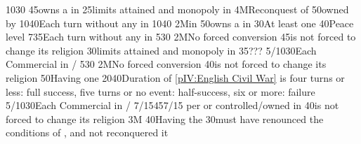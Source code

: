 
 
%
%
{10}{30}{}%
%
%
{}{45}{\ANG owns a \Presidio in \provincePicardie}%
%
%
{}{25}{\MNU limits attained and monopoly in }%
%
\EUobjective4M{Reconquest of \provinceGuyenne}{}%
{}{50}{\provinceGuyenne owned by \paysmajeurAngleterre}%
%
%
{10}{40}{Each turn without any \REVOLT in \regionIrlande}%
%
%
%
{10}{40}{}%
%
\EUobjective2M{\Presidio in \provincePicardie}{}%
{}{50}{\ANG owns a \Presidio in \provincePicardie}%
%
%
{}{30}{At least one \COL}%
%
%
{}{40}{Peace level }%
%
%
{7}{35}{Each turn without any \REVOLT in \regionIrlande}
%
%
%
{5}{30}{}%
%
\EUobjective2M{No forced conversion}{}%
{}{45}{\ANG is not forced to change its religion}%
%
%
{}{30}{\MNU limits attained and monopoly in }%
%
%
%
{}{35}{???}%
%
%
{5/10}{30}{Each Commercial  in \CTZ/\STZ}
%
%
%
{5}{30}{}%
%
\EUobjective2M{No forced conversion}{}%
{}{40}{\ANG is not forced to change its religion}%
%
%
{}{50}{Having one }%
%
%
{20}{40}{Duration of \ref{pIV:English Civil War} is four turns or less: full
  success, five turns or no event: half-success, six or more: failure}%
%
%
{5/10}{30}{Each Commercial  in \CTZ/\STZ}
%
%
%
{7/15}{45}{7/15 \VPs per \TP or \COL controlled/owned in \continentCaraibes}%
%
%
{}{40}{\ANG is not forced to change its religion}%
%
\EUobjective3M{}{}%
{}{40}{Having the }%
%
%
{}{30}{\HIS must have renounced the conditions of , and not reconquered it}%
%
